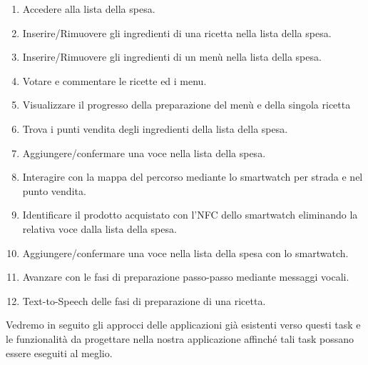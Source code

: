 \begin{enumerate}
\item Accedere alla lista della spesa.
\item Inserire/Rimuovere gli ingredienti di una ricetta nella lista della spesa.
\item Inserire/Rimuovere gli ingredienti di un menù nella lista della spesa.

\item Votare e commentare le ricette ed i menu.

\item Visualizzare il progresso della preparazione del menù e della singola ricetta



\item Trova i punti vendita degli ingredienti della lista della spesa.
\item Aggiungere/confermare una voce nella lista della spesa.
\item Interagire con la mappa del percorso mediante lo smartwatch per strada e nel punto vendita.
\item Identificare il prodotto acquistato con l'NFC dello smartwatch eliminando la relativa voce dalla lista della spesa.
\item Aggiungere/confermare una voce nella lista della spesa con lo smartwatch.


\item Avanzare con le fasi di preparazione passo-passo mediante messaggi vocali.
\item Text-to-Speech delle fasi di preparazione di una ricetta.


\end{enumerate}

Vedremo in seguito gli approcci delle applicazioni già esistenti verso
questi task e le funzionalità da progettare nella nostra applicazione
affinché tali task possano essere eseguiti al meglio.


